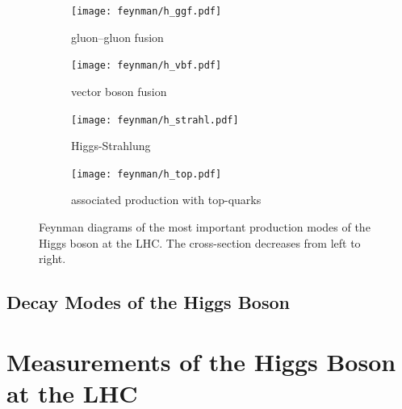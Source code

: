 \begin{figure}[htb]
    \centering
    \begin{subfigure}[t]{0.302\textwidth}
        \texttt{[image: feynman/h\_ggf.pdf]}
        \caption{gluon--gluon fusion}\label{fig:theory:higgs:ggf}
    \end{subfigure}
    \begin{subfigure}[t]{0.201\textwidth}
        \captionsetup{justification=raggedright}
        \texttt{[image: feynman/h\_vbf.pdf]}
        \caption{vector boson fusion}\label{fig:theory:higgs:vbf}
    \end{subfigure}
    \begin{subfigure}[t]{0.201\textwidth}
        \texttt{[image: feynman/h\_strahl.pdf]}
        \caption{Higgs-Strahlung}\label{fig:theory:higgs:vbf}
    \end{subfigure}
    \begin{subfigure}[t]{0.246\textwidth}
        \captionsetup{justification=raggedright}
        \texttt{[image: feynman/h\_top.pdf]}
        \caption{associated \mbox{production} with top-quarks}\label{fig:theory:higgs:vbf}
    \end{subfigure}
    \caption{Feynman diagrams of the most important production modes of the Higgs boson at the LHC\@. The cross-section
             decreases from left to right.}\label{fig:theory:higgs:production}
\end{figure}

\subsection{Decay Modes of the Higgs Boson}
\label{sub:theory:higgs:decay}

\section{Measurements of the Higgs Boson at the LHC}
\label{sec:theory:measurements}


